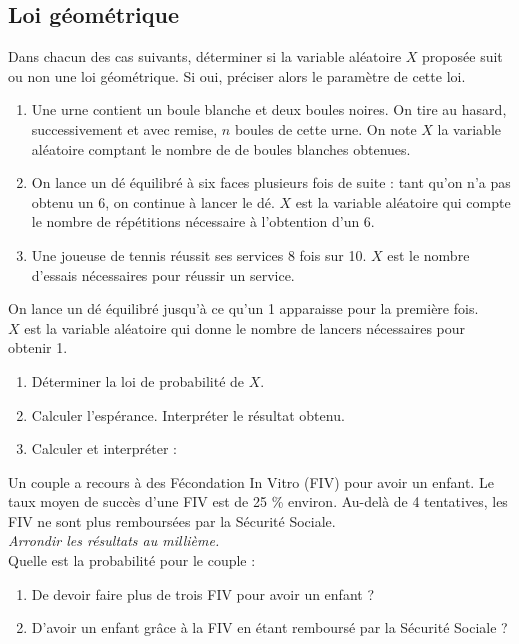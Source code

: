 \documentclass[a4paper,11pt,exos]{nsi} %
\begin{document}
\subsection*{Loi géométrique}

\exo{}%
Dans chacun des cas suivants, déterminer si la variable aléatoire $X$ proposée suit ou non une loi géométrique. Si oui, préciser alors le paramètre de cette loi.
\begin{enumerate}
    \item Une urne contient un boule blanche et deux boules noires. On tire au hasard, successivement et avec remise, $n$ boules de cette urne. On note $X$ la variable aléatoire comptant le nombre de de boules blanches obtenues.
    \item On lance un dé équilibré à six faces plusieurs fois de suite : tant qu'on n'a pas obtenu un 6, on continue à lancer le dé. $X$ est la variable aléatoire qui compte le nombre de répétitions nécessaire à l'obtention d'un 6.
    \item Une joueuse de tennis réussit ses services 8 fois sur 10. $X$ est le nombre d'essais nécessaires pour réussir un service.
\end{enumerate}

\exo{}%
On lance un dé équilibré jusqu'à ce qu'un 1 apparaisse pour la première fois.\\
$X$ est la variable aléatoire qui donne le nombre de lancers nécessaires pour obtenir 1.
\begin{enumerate}
    \item Déterminer la loi de probabilité de $X$.
    \item Calculer l'espérance. Interpréter le résultat obtenu.
    \item Calculer et interpréter :
    \begin{multicols}{3}
    \end{multicols}
\end{enumerate}

\exo{}
Un couple a recours à des Fécondation In Vitro (FIV) pour avoir un enfant. Le taux moyen de succès d'une FIV est de 25 \% environ. Au-delà de 4 tentatives, les FIV ne sont plus remboursées par la Sécurité Sociale.\\
\textit{Arrondir les résultats au millième.}\\
Quelle est la probabilité pour le couple :
\begin{enumerate}
    \item De devoir faire plus de trois FIV pour avoir un enfant ?
    \item D'avoir un enfant grâce à la FIV en étant remboursé par la Sécurité Sociale ?
\end{enumerate}
\end{document}
